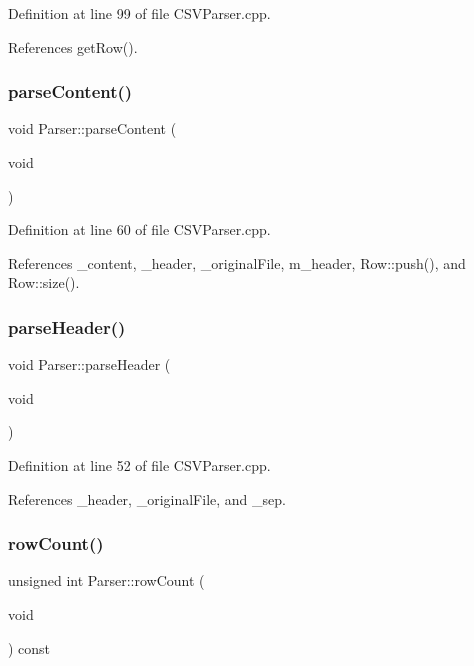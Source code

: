 Definition at line 99 of file C\+S\+V\+Parser.\+cpp.



References get\+Row().

\mbox{\label{class_parser_a7fe27b82f7adf8633d633ee79e608012}} 
\subsubsection{parseContent()}
{\footnotesize\ttfamily void Parser\+::parse\+Content (\begin{DoxyParamCaption}\item[{void}]{ }\end{DoxyParamCaption})\hspace{0.3cm}{\ttfamily [protected]}}



Definition at line 60 of file C\+S\+V\+Parser.\+cpp.



References \+\_\+content, \+\_\+header, \+\_\+original\+File, m\+\_\+header, Row\+::push(), and Row\+::size().

\mbox{\label{class_parser_adf0f8593adc24b7c2c9318473afcf8e4}} 
\subsubsection{parseHeader()}
{\footnotesize\ttfamily void Parser\+::parse\+Header (\begin{DoxyParamCaption}\item[{void}]{ }\end{DoxyParamCaption})\hspace{0.3cm}{\ttfamily [protected]}}



Definition at line 52 of file C\+S\+V\+Parser.\+cpp.



References \+\_\+header, \+\_\+original\+File, and \+\_\+sep.

\mbox{\label{class_parser_a3cf277ff6ffc29b4be24adc8af113cc9}} 
\subsubsection{rowCount()}
{\footnotesize\ttfamily unsigned int Parser\+::row\+Count (\begin{DoxyParamCaption}\item[{void}]{ }\end{DoxyParamCaption}) const}



